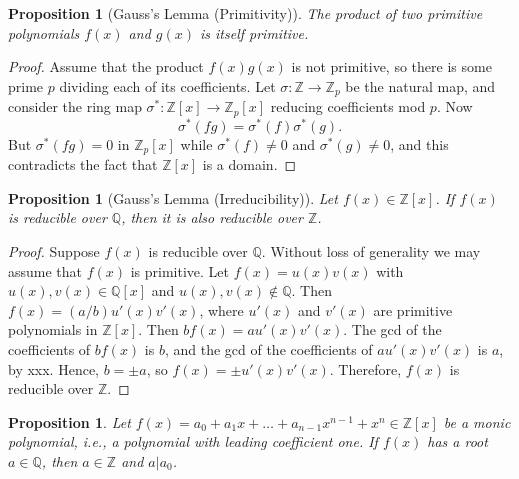 \documentclass[draft]{article}
\newtheorem{prop}[thm]{Proposition}
\theoremstyle{definition}
\theoremstyle{remark}
\begin{document}
		    \begin{prop}[Gauss's Lemma (Primitivity)]
		        The product of two primitive polynomials $f(x)$ and $g(x)$ is itself primitive.
		    \end{prop}
		    
		    \begin{proof}
		        Assume that the product $f(x)g(x)$ is not primitive, so there is some prime $p$ dividing each of its coefficients. Let $\sigma: \mathbb{Z} \to \mathbb{Z}_p$ be the natural map, and consider the ring map $\sigma^{*}: \mathbb{Z}[x] \to \mathbb{Z}_p[x]$ reducing coefficients mod $p$. Now
		        \begin{equation*}
		            \sigma^{*}(fg) = \sigma^{*}(f)\sigma^{*}(g).
		        \end{equation*}
		        But $\sigma^{*}(fg) = 0$ in $\mathbb{Z}_p[x]$ while $\sigma^{*}(f) \neq 0$ and $\sigma^{*}(g) \neq 0$, and this contradicts the fact that $\mathbb{Z}[x]$ is a domain.
		    \end{proof}
			
			\begin{prop}[Gauss's Lemma (Irreducibility)]
				Let $f(x) \in \mathbb{Z}[x]$. If $f(x)$ is reducible over $\mathbb{Q}$, then it is also reducible over $\mathbb{Z}$.
			\end{prop}
			
			\begin{proof}
				Suppose $f(x)$ is reducible over $\mathbb{Q}$. Without loss of generality we may assume that $f(x)$ is primitive. Let $f(x) = u(x)v(x)$ with $u(x), v(x) \in \mathbb{Q}[x]$ and $u(x), v(x) \notin \mathbb{Q}$. Then $f(x) = (a / b)u'(x)v'(x)$, where $u'(x)$ and $v'(x)$ are primitive polynomials in $\mathbb{Z}[x]$. Then $bf(x) = au'(x)v'(x)$. The gcd of the coefficients of $bf(x)$ is $b$, and the gcd of the coefficients of $au'(x)v'(x)$ is $a$, by xxx. Hence, $b = \pm a$, so $f(x) = \pm u'(x)v'(x)$. Therefore, $f(x)$ is reducible over $\mathbb{Z}$.
			\end{proof}
			
			\begin{prop}
				Let $f(x) = a_0 + a_1x + \dots + a_{n - 1}x^{n - 1} + x^n \in \mathbb{Z}[x]$ be a monic polynomial, i.e., a polynomial with leading coefficient one. If $f(x)$ has a root $a \in \mathbb{Q}$, then $a \in \mathbb{Z}$ and $a | a_0$.
			\end{prop}
			
\end{document}
